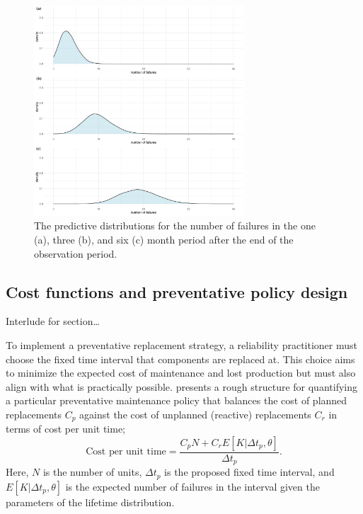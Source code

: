 \begin{figure}
  \centering
  \includegraphics[width=0.7\textwidth]{./figures/ch-3/E-n-failures-densities.pdf}
  \caption{The predictive distributions for the number of failures in the one (a), three (b), and six (c) month period after the end of the observation period.}
  \label{fig:E-Nfailrues-densities}
\end{figure}

\subsection{Cost functions and preventative policy design} \label{subsec:idler-cost-function}

Interlude for section\dots

To implement a preventative replacement strategy, a reliability practitioner must choose the fixed time interval that components are replaced at. This choice aims to minimize the expected cost of maintenance and lost production but must also align with what is practically possible. \citet{jardine2013} presents a rough structure for quantifying a particular preventative maintenance policy that balances the cost of planned replacements $C_p$ against the cost of unplanned (reactive) replacements $C_r$ in terms of cost per unit time; 
\begin{equation*}
  \text{Cost per unit time} = \frac{C_p N + C_r E[K|\Delta t_p,\theta]}{\Delta t_p}.
\end{equation*}
Here, $N$ is the number of units, $\Delta t_p$ is the proposed fixed time interval, and $E[K|\Delta t_p,\theta]$ is the expected number of failures in the interval given the parameters of the lifetime distribution.


